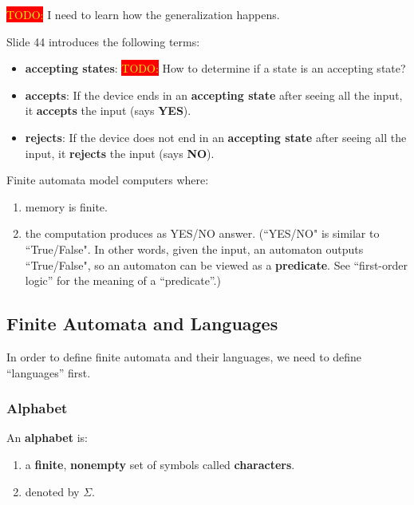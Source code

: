 \documentclass[12pt, letterpaper, oneside]{book}
\begin{document}
\colorbox{red}{\textcolor{yellow}{TODO:}} I need to learn how the generalization happens.

Slide 44 introduces the following terms:
\begin{itemize}
  \item \textbf{accepting states}: \colorbox{red}{\textcolor{yellow}{TODO:}}
        How to determine if a state is an accepting state?
  \item \textbf{accepts}: If the device ends in an \textbf{accepting state}
        after seeing all the input, it \textbf{accepts} the input (says
        \textbf{YES}).
  \item \textbf{rejects}: If the device does not end in an \textbf{accepting
          state} after seeing all the input, it \textbf{rejects} the input (says
        \textbf{NO}).
\end{itemize}

Finite automata model computers where:
\begin{enumerate}
  \item memory is finite.
  \item the computation produces as YES/NO answer. (``YES/NO" is similar to
        ``True/False". In other words, given the input, an automaton outputs
        ``True/False", so an automaton can be viewed as a \textbf{predicate}. See
        ``first-order logic'' for the meaning of a ``predicate''.)
\end{enumerate}

\subsection{Finite Automata and Languages}

In order to define finite automata and their languages, we need to define ``languages'' first.

\subsubsection{Alphabet}

An \textbf{alphabet} is:
\begin{enumerate}
  \item a \textbf{finite}, \textbf{nonempty} set of symbols called \textbf{characters}.
  \item denoted by $\Sigma$.
\end{enumerate}
\end{document}
